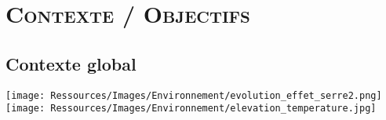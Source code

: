 \documentclass[xcolor=x11names, compress, 11pt]{beamer}
\begin{document}










\section{\scshape Contexte / Objectifs}
\subsection{Contexte global}
\begin{frame}[c]
    \vfill
    \centering
    \texttt{[image: Ressources/Images/Environnement/evolution\_effet\_serre2.png]}
    \vfill
    \texttt{[image: Ressources/Images/Environnement/elevation\_temperature.jpg]}
    \vfill
\end{frame}




\end{document}
